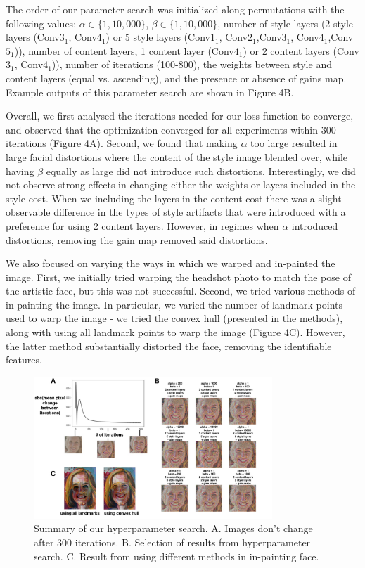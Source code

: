 \documentclass{article}
\begin{document}
The order of our parameter search was initialized along permutations with the following values: $\alpha \in \{1,10,000\}$, $\beta \in \{1,10,000\}$, number of style layers (2 style layers (Conv$3_1$, Conv4$_1$) or 5 style layers (Conv$\mathrm1_1$, Conv$2_1$,Conv$3_1$, Conv$4_1$,Conv$5_1$)), number of content layers, 1 content layer (Conv$4_1$)  or 2 content layers (Conv$3_1$, Conv$4_1$)), number of iterations (100-800), the weights between style and content layers (equal vs. ascending), and the presence or absence of gains map. Example outputs of this parameter search are shown in Figure 4B. 

Overall, we first analysed the iterations needed for our loss function to converge, and observed that the optimization converged for all experiments within 300 iterations (Figure 4A). Second, we found that making $\alpha$ too large resulted in large facial distortions where the content of the style image blended over, while having $\beta$ equally as large did not introduce such distortions. Interestingly, we did not observe strong effects in changing either the weights or layers included in the style cost. When we including the layers in the content cost there was a slight observable difference in the types of style artifacts that were introduced with a preference for using 2 content layers. However, in regimes when $\alpha$ introduced distortions, removing the gain map removed said distortions. 

We also focused on varying the ways in which we warped and in-painted the image. First, we initially tried warping the headshot photo to match the pose of the artistic face, but this was not successful. Second, we tried various methods of in-painting the image. In particular, we varied the number of landmark points used to warp the image - we tried the convex hull (presented in the methods), along with using all landmark points to warp the image (Figure 4C). However, the latter method substantially distorted the face, removing the identifiable features.
 

\begin{figure}[H]
  \begin{center}
    \includegraphics[width=0.8\textwidth]{results2.jpg}
    \caption{Summary of our hyperparameter search. A. Images don't change after 300 iterations. B. Selection of results from hyperparameter search. C. Result from using different methods in in-painting face.} \label{fig:examples}
  \end{center}
\end{figure} 
\end{document}
